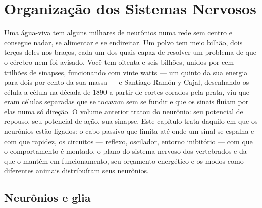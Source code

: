 \chapter{Organização dos Sistemas Nervosos}\label{ch:b3:nervous-systems}

Uma água-viva tem alguns milhares de neurônios numa rede sem centro e
consegue nadar, se alimentar e se endireitar. Um polvo tem meio bilhão,
dois terços deles nos braços, cada um dos quais capaz de resolver um
problema de que o cérebro nem foi avisado. Você tem oitenta e seis
bilhões, unidos por cem trilhões de sinapses, funcionando com vinte
watts --- um quinto da sua energia para dois por cento da sua massa ---
e Santiago Ramón y Cajal, desenhando-os célula a célula na década de
1890 a partir de cortes corados pela prata, viu que eram células
separadas que se tocavam sem se fundir e que os sinais fluíam por elas
numa só direção. O volume anterior tratou do neurônio: seu potencial de
repouso, seu potencial de ação, sua sinapse. Este capítulo trata daquilo
em que os neurônios estão ligados: o cabo passivo que limita até onde um
sinal se espalha e com que rapidez, os circuitos --- reflexo, oscilador,
entorno inibitório --- com que o comportamento é montado, o plano do
sistema nervoso dos vertebrados e da  que o mantém em
funcionamento, seu orçamento energético e os modos como diferentes
animais distribuíram seus neurônios.

\section{Neurônios e glia}

